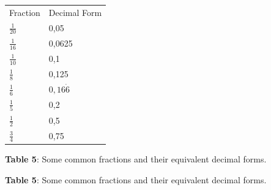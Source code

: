           \begin{table}
        \begin{center}
      \label{m38346*uid50}
    \noindent
      \tablelasttail{}
      \begin{xtabular}[t]{|l|l|}\hline
        Fraction &
        Decimal Form%
     \tabularnewline{}
                $\frac{1}{20}$
               &
        0,05%
     \tabularnewline{}
                $\frac{1}{16}$
               &
        0,0625%
     \tabularnewline{}
                $\frac{1}{10}$
               &
        0,1%
     \tabularnewline{}
                $\frac{1}{8}$
               &
        0,125%
     \tabularnewline{}
                $\frac{1}{6}$
               &
                $0,16\dot{6}$
     \tabularnewline{}
                $\frac{1}{5}$
               &
        0,2%
     \tabularnewline{}
                $\frac{1}{2}$
               &
        0,5%
     \tabularnewline{}
                $\frac{3}{4}$
               &
        0,75%
     \tabularnewline{}
    \end{xtabular}
      \end{center}
    \begin{center}{\small\bfseries Table 5}: Some common fractions and their equivalent decimal forms.\end{center}
    \begin{caption}{\small\bfseries Table 5}: Some common fractions and their equivalent decimal forms.\end{caption}
\end{table}
    \par
